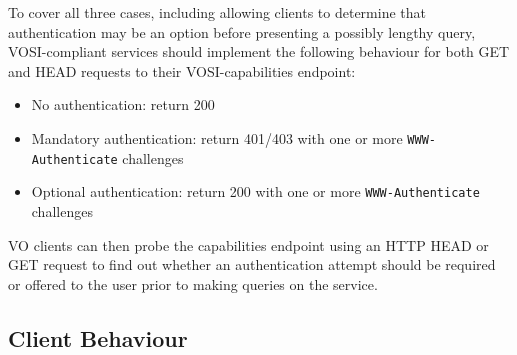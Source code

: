 \documentclass[11pt,a4paper]{ivoa}
\newcommand{\header}[1]{{\tt #1}}
\begin{document}
To cover all three cases,
including allowing clients to determine that authentication may be an
option before presenting a possibly lengthy query,
VOSI-compliant services should implement the following behaviour
for both GET and HEAD requests to their VOSI-capabilities endpoint:
\begin{itemize}
  \item No authentication:
        return 200
  \item Mandatory authentication:
        return 401/403 with one or more \header{WWW-Authenticate} challenges
  \item Optional authentication:
        return 200 with one or more \header{WWW-Authenticate} challenges
\end{itemize}
VO clients can then probe the capabilities endpoint using an HTTP HEAD
or GET request to find out whether an authentication attempt should be
required or offered to the user prior to making queries on the service.

\subsection{Client Behaviour}
\end{document}
